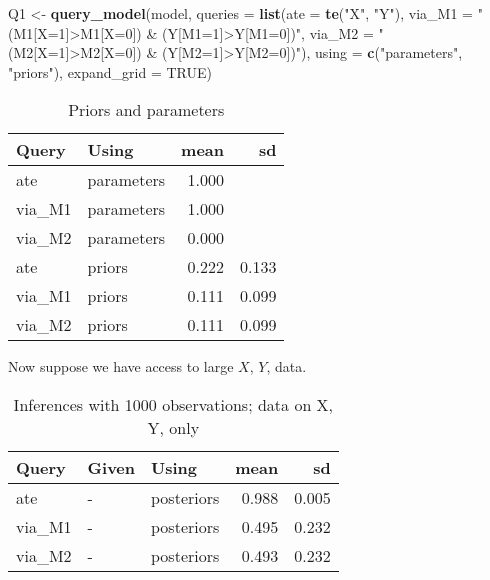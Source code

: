 \documentclass[
  12pt,
]{book}
\newenvironment{Shaded}{\begin{snugshade}}{\end{snugshade}}
\newcommand{\DataTypeTok}[1]{\textcolor[rgb]{0.13,0.29,0.53}{#1}}
\newcommand{\KeywordTok}[1]{\textcolor[rgb]{0.13,0.29,0.53}{\textbf{#1}}}
\newcommand{\NormalTok}[1]{#1}
\newcommand{\OtherTok}[1]{\textcolor[rgb]{0.56,0.35,0.01}{#1}}
\newcommand{\StringTok}[1]{\textcolor[rgb]{0.31,0.60,0.02}{#1}}
\begin{document}
\begin{Shaded}
\begin{Highlighting}[]
\NormalTok{Q1 <-}\StringTok{ }\KeywordTok{query_model}\NormalTok{(model, }
  \DataTypeTok{queries =} \KeywordTok{list}\NormalTok{(}\DataTypeTok{ate =} \KeywordTok{te}\NormalTok{(}\StringTok{"X"}\NormalTok{, }\StringTok{"Y"}\NormalTok{), }
                 \DataTypeTok{via_M1 =} \StringTok{"(M1[X=1]>M1[X=0]) & (Y[M1=1]>Y[M1=0])"}\NormalTok{, }
                 \DataTypeTok{via_M2 =} \StringTok{"(M2[X=1]>M2[X=0]) & (Y[M2=1]>Y[M2=0])"}\NormalTok{), }
  \DataTypeTok{using =} \KeywordTok{c}\NormalTok{(}\StringTok{"parameters"}\NormalTok{, }\StringTok{"priors"}\NormalTok{),}
  \DataTypeTok{expand_grid =} \OtherTok{TRUE}\NormalTok{) }
\end{Highlighting}
\end{Shaded}

\begin{table}

\caption{\label{tab:apppaths3}Priors and parameters}
\centering
\begin{tabular}[t]{l|l|r|r}
\hline
Query & Using & mean & sd\\
\hline
ate & parameters & 1.000 & \\
\hline
via\_M1 & parameters & 1.000 & \\
\hline
via\_M2 & parameters & 0.000 & \\
\hline
ate & priors & 0.222 & 0.133\\
\hline
via\_M1 & priors & 0.111 & 0.099\\
\hline
via\_M2 & priors & 0.111 & 0.099\\
\hline
\end{tabular}
\end{table}

Now suppose we have access to large \(X\), \(Y\), data.

\begin{table}

\caption{\label{tab:apppath4}Inferences with 1000 observations; data on X, Y, only}
\centering
\begin{tabular}[t]{l|l|l|r|r}
\hline
Query & Given & Using & mean & sd\\
\hline
ate & - & posteriors & 0.988 & 0.005\\
\hline
via\_M1 & - & posteriors & 0.495 & 0.232\\
\hline
via\_M2 & - & posteriors & 0.493 & 0.232\\
\hline
\end{tabular}
\end{table}
\end{document}
